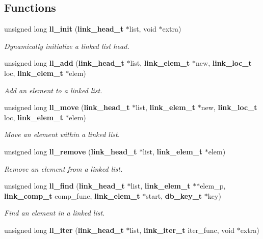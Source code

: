 \subsection*{Functions}
\begin{CompactItemize}
\item 
unsigned long {\bf ll\_\-init} ({\bf link\_\-head\_\-t} $\ast$list, void $\ast$extra)
\begin{CompactList}\small\item\em Dynamically initialize a linked list head.\item\end{CompactList}\item 
unsigned long {\bf ll\_\-add} ({\bf link\_\-head\_\-t} $\ast$list, {\bf link\_\-elem\_\-t} $\ast$new, {\bf link\_\-loc\_\-t} loc, {\bf link\_\-elem\_\-t} $\ast$elem)
\begin{CompactList}\small\item\em Add an element to a linked list.\item\end{CompactList}\item 
unsigned long {\bf ll\_\-move} ({\bf link\_\-head\_\-t} $\ast$list, {\bf link\_\-elem\_\-t} $\ast$new, {\bf link\_\-loc\_\-t} loc, {\bf link\_\-elem\_\-t} $\ast$elem)
\begin{CompactList}\small\item\em Move an element within a linked list.\item\end{CompactList}\item 
unsigned long {\bf ll\_\-remove} ({\bf link\_\-head\_\-t} $\ast$list, {\bf link\_\-elem\_\-t} $\ast$elem)
\begin{CompactList}\small\item\em Remove an element from a linked list.\item\end{CompactList}\item 
unsigned long {\bf ll\_\-find} ({\bf link\_\-head\_\-t} $\ast$list, {\bf link\_\-elem\_\-t} $\ast$$\ast$elem\_\-p, {\bf link\_\-comp\_\-t} comp\_\-func, {\bf link\_\-elem\_\-t} $\ast$start, {\bf db\_\-key\_\-t} $\ast$key)
\begin{CompactList}\small\item\em Find an element in a linked list.\item\end{CompactList}\item 
unsigned long {\bf ll\_\-iter} ({\bf link\_\-head\_\-t} $\ast$list, {\bf link\_\-iter\_\-t} iter\_\-func, void $\ast$extra)
$$
\end{CompactItemize}
